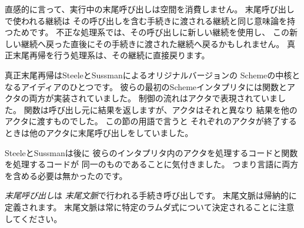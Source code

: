 \begin{rationale}

直感的に言って、実行中の末尾呼び出しは空間を消費しません。
末尾呼び出しで使われる継続は
その呼び出しを含む手続きに渡される継続と同じ意味論を持つためです。
不正な処理系では、その呼び出しに新しい継続を使用し、
この新しい継続へ戻った直後にその手続きに渡された継続へ戻るかもしれません。
真正末尾再帰を行う処理系は、その継続に直接戻ります。

真正末尾再帰はSteeleとSussmanによるオリジナルバージョンの
Schemeの中核となるアイディアのひとつです。
彼らの最初のSchemeインタプリタには関数とアクタの両方が実装されていました。
制御の流れはアクタで表現されていました。
関数は呼び出し元に結果を返しますが、アクタはそれと異なり
結果を他のアクタに渡すものでした。
この節の用語で言うと
それぞれのアクタが終了するときは他のアクタに末尾呼び出しをしていました。

SteeleとSussmanは後に
彼らのインタプリタ内のアクタを処理するコードと関数を処理するコードが
同一のものであることに気付きました。
つまり言語に両方を含める必要は無かったのです。

\end{rationale}

{\em 末尾呼び出し}は
{\em 末尾文脈}で行われる手続き呼び出しです。
末尾文脈は帰納的に定義されます。
末尾文脈は常に特定のラムダ式について決定されることに注意してください。

